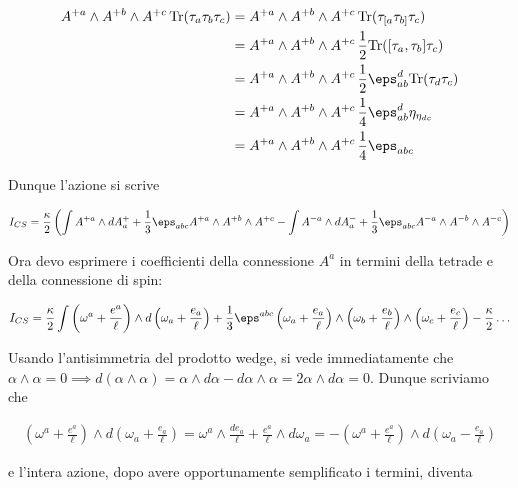 \documentclass{report}
\begin{document}
\begin{align}
    A^{+a}\wedge A^{+b} \wedge A^{+c} \, \text{Tr}(\tau_a\tau_b\tau_c) &= A^{+a}\wedge A^{+b} \wedge A^{+c} \, \text{Tr}(\tau_{[a}\tau_{b]}\tau_c) \\
    &= A^{+a}\wedge A^{+b} \wedge A^{+c} \, \frac{1}{2}\text{Tr}([\tau_a,\tau_b ]\tau_c) \\
    &= A^{+a}\wedge A^{+b} \wedge A^{+c} \, \frac{1}{2}\eps_{ab}^d\text{Tr}(\tau_d\tau_c) \\
    &= A^{+a}\wedge A^{+b} \wedge A^{+c} \, \frac{1}{4}\eps_{ab}^d\eta_{\eta_{dc}} \\
    &= A^{+a}\wedge A^{+b} \wedge A^{+c} \, \frac{1}{4}\eps_{abc} 
\end{align}

Dunque l'azione si scrive 

\begin{align}
    I_{CS} = \frac{\kappa}{2}\left(\int A^{+a}\wedge dA^+_a + \frac{1}{3}\eps_{abc}A^{+a}\wedge A^{+b}\wedge A^{+c} - \int A^{-a}\wedge dA^-_a + \frac{1}{3}\eps_{abc}A^{-a}\wedge A^{-b}\wedge A^{-c}\right)
\end{align}

Ora devo esprimere i coefficienti della connessione \(A^a\) in termini della tetrade e della connessione di spin: 

\begin{align}
    I_{CS} = \frac{\kappa}{2}\int \left( \omega^a + \frac{e^a}{\ell}\right) \wedge d\left( \omega_a + \frac{e_a}{\ell}\right) + \frac{1}{3}\eps^{abc} \left( \omega_a + \frac{e_a}{\ell}\right) \wedge \left( \omega_b + \frac{e_b}{\ell}\right) \wedge \left( \omega_c + \frac{e_c}{\ell}\right) - \frac{\kappa}{2} \ldots 
\end{align}

Usando l'antisimmetria del prodotto wedge, si vede immediatamente che \(\alpha \wedge \alpha = 0 \implies d(\alpha \wedge \alpha) = \alpha \wedge d\alpha - d\alpha \wedge \alpha = 2\alpha \wedge d\alpha = 0\). Dunque scriviamo che 

\begin{align}
    \left( \omega^a + \frac{e^a}{\ell}\right) \wedge d\left( \omega_a + \frac{e_a}{\ell}\right) = \omega^a \wedge \frac{d e_a}{\ell} + \frac{e^a}{\ell} \wedge d\omega_a = -\left( \omega^a + \frac{e^a}{\ell}\right) \wedge d\left( \omega_a - \frac{e_a}{\ell}\right)
\end{align}

e l'intera azione, dopo avere opportunamente semplificato i termini, diventa 
\end{document}
